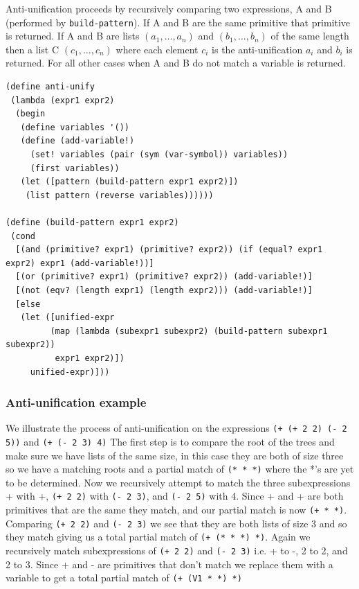 \documentclass[a4paper,10pt]{article}
\begin{document}
Anti-unification proceeds by recursively comparing two expressions, A and B (performed by \texttt{build-pattern}).  If A and B are the same primitive that primitive is returned.  If A and B are lists $(a_1,\ldots,a_n)$ and $(b_1,\ldots,b_n)$ of the same length then a list C $(c_1,\ldots,c_n)$ where each element $c_i$ is the anti-unification $a_i$ and $b_i$ is returned.  For all other cases when A and B do not match a variable is returned.

\begin{lstlisting}[frame=trBL]
(define anti-unify
 (lambda (expr1 expr2)
  (begin
   (define variables '())
   (define (add-variable!)
     (set! variables (pair (sym (var-symbol)) variables))
     (first variables))
   (let ([pattern (build-pattern expr1 expr2)])
    (list pattern (reverse variables))))))

(define (build-pattern expr1 expr2)
 (cond 
  [(and (primitive? expr1) (primitive? expr2)) (if (equal? expr1 expr2) expr1 (add-variable!))]
  [(or (primitive? expr1) (primitive? expr2)) (add-variable!)]
  [(not (eqv? (length expr1) (length expr2))) (add-variable!)]
  [else
   (let ([unified-expr 
         (map (lambda (subexpr1 subexpr2) (build-pattern subexpr1 subexpr2))
          expr1 expr2)])
     unified-expr)]))
\end{lstlisting}

\subsubsection{Anti-unification example}
We illustrate the process of anti-unification on the expressions \texttt{(+ (+ 2 2) (- 2 5))} and \texttt{(+ (- 2 3) 4)}
The first step is to compare the root of the trees and make sure we have lists of the same size, in this case they are both of size three so we have a matching roots and a partial match of \texttt{(* * *)} where the *'s are yet to be determined.
Now we recursively attempt to match the three subexpressions + with +, \texttt{(+ 2 2)} with \texttt{(- 2 3)}, and \texttt{(- 2 5)} with 4.
Since + and + are both primitives that are the same they match, and our partial match is now \texttt{(+ * *)}.
Comparing \texttt{(+ 2 2)} and \texttt{(- 2 3)} we see that they are both lists of size 3 and so they match giving us a total partial match of \texttt{(+ (* * *) *)}.
Again we recursively match subexpressions of \texttt{(+ 2 2)} and \texttt{(- 2 3)} i.e. + to -, 2 to 2, and 2 to 3.
Since + and - are primitives that don't match we replace them with a variable to get a total partial match of \texttt{(+ (V1 * *) *)}
\end{document}
